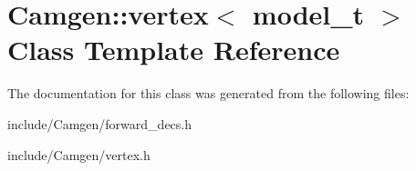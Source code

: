 \hypertarget{a00585}{}\section{Camgen\+:\+:vertex$<$ model\+\_\+t $>$ Class Template Reference}
\label{a00585}


The documentation for this class was generated from the following files\+:\begin{DoxyCompactItemize}
\item 
include/\+Camgen/forward\+\_\+decs.\+h\item 
include/\+Camgen/vertex.\+h\end{DoxyCompactItemize}
